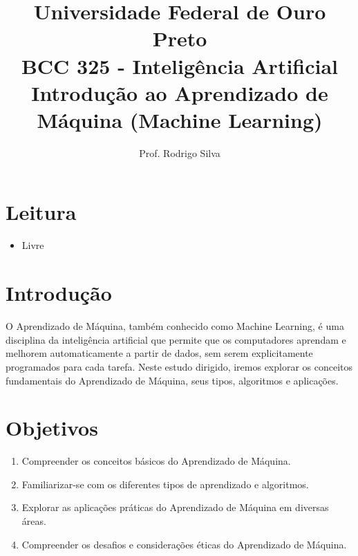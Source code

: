 \documentclass{article}
\title{\vspace{-2 cm}Universidade Federal de Ouro Preto \\ BCC 325 - Inteligência Artificial \\ Introdução ao Aprendizado de Máquina (Machine Learning)
}
\author{Prof. Rodrigo Silva}
\date{}
\begin{document}
\maketitle

\section*{Leitura}

\begin{itemize}
    \item Livre
\end{itemize}

\section{Introdução}
    O Aprendizado de Máquina, também conhecido como Machine Learning, é uma disciplina da inteligência artificial que permite que os computadores aprendam e melhorem automaticamente a partir de dados, sem serem explicitamente programados para cada tarefa. Neste estudo dirigido, iremos explorar os conceitos fundamentais do Aprendizado de Máquina, seus tipos, algoritmos e aplicações.

\section{Objetivos}
    \begin{enumerate}
        \item  Compreender os conceitos básicos do Aprendizado de Máquina.
        \item Familiarizar-se com os diferentes tipos de aprendizado e algoritmos.
        \item Explorar as aplicações práticas do Aprendizado de Máquina em diversas áreas.
        \item Compreender os desafios e considerações éticas do Aprendizado de Máquina.
    \end{enumerate}    
   
\end{document}
